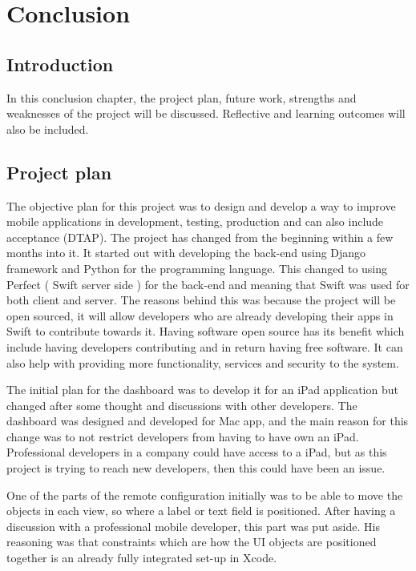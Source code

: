 \chapter{Conclusion}

\label{ch:conclusions}

\section{Introduction}

In this conclusion chapter, the project plan, future work, strengths and weaknesses of the project will be discussed. Reflective and learning outcomes will also be included.

\section{Project plan}

The objective plan for this project was to design and develop a way to improve mobile applications in development, testing, production and can also include acceptance (DTAP). The project has changed from the beginning within a few months into it. It started out with developing the back-end using Django framework and Python for the programming language. This changed to using Perfect ( Swift server side ) for the back-end and meaning that Swift was used for both client and server. The reasons behind this was because the project will be open sourced, it will allow developers who are already developing their apps in Swift to contribute towards it. Having software open source has its benefit which include having developers contributing and in return having free software. It can also help with providing more functionality, services and security to the system.

The initial plan for the dashboard was to develop it for an iPad application but changed after some thought and discussions with other developers. The dashboard was designed and developed for Mac app, and the main reason for this change was to not restrict developers from having to have own an iPad. Professional developers in a company could have access to a iPad, but as this project is trying to reach new developers, then this could have been an issue.

One of the parts of the remote configuration initially was to be able to move the objects in each view, so where a label or text field is positioned. After having a discussion with a professional mobile developer, this part was put aside. His reasoning was that constraints which are how the UI objects are positioned together is an already fully integrated set-up in Xcode.


